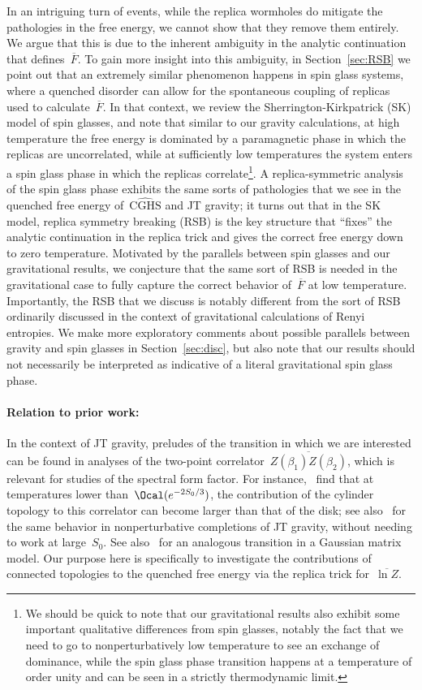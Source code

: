 \documentclass[12pt]{article}
\begin{document}
In an intriguing turn of events, while the replica wormholes do mitigate the pathologies in the free energy, we cannot show that they remove them entirely.  We argue that this is due to the inherent ambiguity in the analytic continuation that defines~$\overline{F}$.  To gain more insight into this ambiguity, in Section~\ref{sec:RSB} we point out that an extremely similar phenomenon happens in spin glass systems, where a quenched disorder can allow for the spontaneous coupling of replicas used to calculate~$\overline{F}$.  In that context, we  review the Sherrington-Kirkpatrick (SK) model of spin glasses, and note that similar to our gravity calculations, at high temperature the free energy is dominated by a paramagnetic phase in which the replicas are uncorrelated, while at sufficiently low temperatures the system enters a spin glass phase in which the replicas correlate\footnote{We should be quick to note that our gravitational results also exhibit some important qualitative differences from spin glasses, notably the fact that we need to go to nonperturbatively low temperature to see an exchange of dominance, while the spin glass phase transition happens at a temperature of order unity and can be seen in a strictly thermodynamic limit.}.  A replica-symmetric analysis of the spin glass phase exhibits the same sorts of pathologies that we see in the quenched free energy of~$\widehat{\mathrm{CGHS}}$ and JT gravity; it turns out that in the SK model, replica symmetry breaking (RSB) is the key structure that ``fixes'' the analytic continuation in the replica trick and gives the correct free energy down to zero temperature.  Motivated by the parallels between spin glasses and our gravitational results, we conjecture that the same sort of RSB is needed in the gravitational case to fully capture the correct behavior of~$\overline{F}$ at low temperature.  Importantly, the RSB that we discuss is notably different from the sort of RSB ordinarily discussed in the context of gravitational calculations of Renyi entropies.  We make more exploratory comments about possible parallels between gravity and spin glasses in Section~\ref{sec:disc}, but also note that our results should not necessarily be interpreted as indicative of a literal gravitational spin glass phase.

\paragraph{Relation to prior work:}  In the context of JT gravity, preludes of the transition in which we are interested can be found in analyses of the two-point correlator~$\overline{Z(\beta_1) Z(\beta_2)}$, which is relevant for studies of the spectral form factor.  For instance,~\cite{OkuSak19,OkuSak20} find that at temperatures lower than~$\Ocal(e^{-2S_0/3})$, the contribution of the cylinder topology to this correlator can become larger than that of the disk; see also~\cite{Joh20a,Joh20} for the same behavior in nonperturbative completions of JT gravity, without needing to work at large~$S_0$.  See also~\cite{Oku19} for an analogous transition in a Gaussian matrix model.  Our purpose here is specifically to investigate the contributions of connected topologies to the quenched free energy via the replica trick for~$\overline{\ln Z}$.
\end{document}
